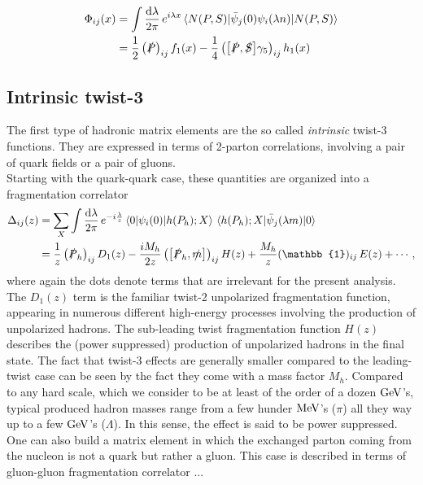 \begin{equation}
    \begin{aligned}
        \Phi_{ij}(x)&= \int\frac{\dd \lambda}{2\pi} \,e^{i\lambda x}\mel{N(P,S)}{\bar \psi_j(0) \psi_i(\lambda n)}{N(P,S)}\\
        &= \frac{1}{2}\left(\slashed{P}\right)_{ij} f_1(x)
        -\frac{1}{4} \left(\comm{\slashed{P}}{\slashed{S}}\gamma_5\right)_{ij} h_1(x)
    \end{aligned}
\end{equation}
\subsection{Intrinsic twist-3}
The first type of hadronic matrix elements are the so called \textit{intrinsic} twist-3 functions. They are expressed in terms of 2-parton correlations, involving a pair of quark fields or a pair of gluons. \\
Starting with the quark-quark case, these quantities are organized into a fragmentation correlator
\begin{equation}
    \begin{aligned}
        \Delta_{ij}(z)&= \sum_X\int\frac{\dd \lambda}{2\pi} \,e^{-i\frac{\lambda}{z}}\mel{0}{\psi_i(0)}{h(P_h);X}\mel{h(P_h);X}{\bar \psi_j(\lambda m)}{0}\\
        &= \frac{1}{z}\left(\slashed{P}_h\right)_{ij} D_1(z)-\frac{iM_h}{2z} \left(\comm{\slashed{P}_h}{\slashed{m}}\right)_{ij} H(z)+\frac{M_h}{z}(\mathbb{1})_{ij}\,E(z)+\cdots,
        \end{aligned}
\end{equation}
where again the dots denote terms that are irrelevant for the present analysis. The $D_1(z)$ term is the familiar twist-2 unpolarized fragmentation function, appearing in numerous different high-energy processes involving the production of unpolarized hadrons. The sub-leading twist fragmentation function $H(z)$ describes the (power suppressed) production of unpolarized hadrons in the final state. The fact that twist-3 effects are generally smaller compared to the leading-twist case can be seen by the fact they come with a mass factor $M_h$. Compared to any hard scale, which we consider to be at least of the order of a dozen $\rm GeV$'s, typical produced hadron masses range from a few hunder $\rm MeV$'s ($\pi$) all they way up to a few $\rm GeV$'s ($\Lambda$). In this sense, the effect is said to be power suppressed.\\
One can also build a matrix element in which the exchanged parton coming from the nucleon is not a quark but rather a gluon. This case is described in terms of gluon-gluon fragmentation correlator ...


